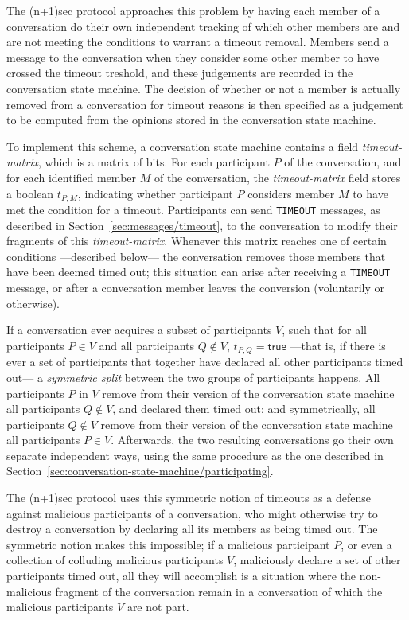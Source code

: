 \documentclass{article}
\def\npmessage#1{\texttt{#1}}
\def\smfield#1{\textsl{#1}}
\def\type#1{\textsf{#1}}
\begin{document}
The (n+1)sec protocol approaches this problem by having each member of a conversation do their own independent tracking of which other members are and are not meeting the conditions to warrant a timeout removal.
Members send a message to the conversation when they consider some other member to have crossed the timeout treshold, and these judgements are recorded in the conversation state machine.
The decision of whether or not a member is actually removed from a conversation for timeout reasons is then specified as a judgement to be computed from the opinions stored in the conversation state machine.


To implement this scheme, a conversation state machine contains a field \smfield{timeout-matrix}, which is a matrix of bits.
For each participant $P$ of the conversation, and for each identified member $M$ of the conversation, the \smfield{timeout-matrix} field stores a \type{boolean} $t_{P,M}$, indicating whether participant $P$ considers member $M$ to have met the condition for a timeout.
Participants can send \npmessage{TIMEOUT} messages, as described in Section~\ref{sec:messages/timeout}, to the conversation to modify their fragments of this \smfield{timeout-matrix}.
Whenever this matrix reaches one of certain conditions ---described below--- the conversation removes those members that have been deemed timed out; this situation can arise after receiving a \npmessage{TIMEOUT} message, or after a conversation member leaves the conversion (voluntarily or otherwise).

If a conversation ever acquires a subset of participants $V$, such that for all participants $P \in V$ and all participants $Q \not\in V$, $t_{P,Q} = \textsf{true}$ ---that is, if there is ever a set of participants that together have declared all other participants timed out--- a \emph{symmetric split} between the two groups of participants happens.
All participants $P$ in $V$ remove from their version of the conversation state machine all participants $Q \not\in V$, and declared them timed out; and symmetrically, all participants $Q \not\in V$ remove from their version of the conversation state machine all participants $P \in V$.
Afterwards, the two resulting conversations go their own separate independent ways, using the same procedure as the one described in Section~\ref{sec:conversation-state-machine/participating}.

The (n+1)sec protocol uses this symmetric notion of timeouts as a defense against malicious participants of a conversation, who might otherwise try to destroy a conversation by declaring all its members as being timed out.
The symmetric notion makes this impossible; if a malicious participant $P$, or even a collection of colluding malicious participants $V$, maliciously declare a set of other participants timed out, all they will accomplish is a situation where the non-malicious fragment of the conversation remain in a conversation of which the malicious participants $V$ are not part.
\end{document}
